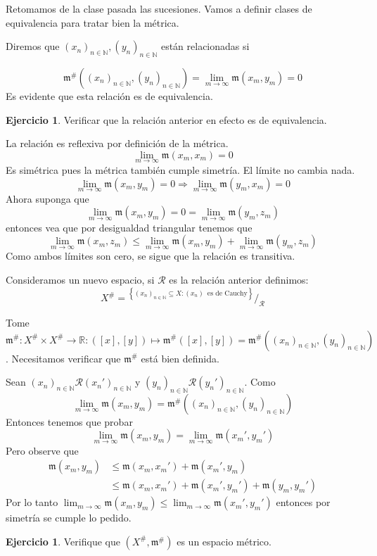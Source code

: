 \documentclass[12pt]{article}
\theoremstyle{plain}
\theoremstyle{definition}
\newtheorem{Ej}[Th]{Ejercicio}
\theoremstyle{remark}
\numberwithin{equation}{section}
\newcommand{\bN}{\mathbb{N}}        %
\newcommand{\bR}{\mathbb{R}}        %
\newcommand{\mm}{\mathfrak{m}}      %
\newcommand{\cR}{\mathcal{R}}       %
\renewcommand{\leq}{\leqslant}      %
\renewcommand{\:}{\colon}           %
\newcommand*\quot[2]{{^{\textstyle #1}\big/_{\textstyle #2}}}
\newcommand{\conj}[1]{\left\lbrace#1\right\rbrace}
\newcommand{\bonj}[1]{\left\lbrack#1\right\rbrack}
\begin{document}
\begin{multicols}{2}
Retomamos de la clase pasada las sucesiones. Vamos a definir clases de equivalencia para tratar bien la métrica. \par
Diremos que $(x_n)_{n\in\bN},(y_n)_{n\in\bN}$ están relacionadas si

$$\mm^\#((x_n)_{n\in\bN},(y_n)_{n\in\bN})=\lim_{m\to\infty}\mm(x_m,y_m)=0$$
Es evidente que esta relación es de equivalencia.
\begin{Ej}
  Verificar que la relación anterior en efecto es de equivalencia.
\end{Ej}

\begin{ptcb}

 La relación es reflexiva por definición de la métrica.
  $$\lim_{m\to\infty}\mm(x_m,x_m)=0$$
 Es simétrica pues la métrica también cumple simetría. El límite no cambia nada.
  $$\lim_{m\to\infty}\mm(x_m,y_m)=0\Rightarrow \lim_{m\to\infty}\mm(y_m,x_m)=0$$
Ahora suponga que
$$\lim_{m\to\infty}\mm(x_m,y_m)=0=\lim_{m\to\infty}\mm(y_m,z_m)$$
 entonces vea que por desigualdad triangular tenemos que
    $$\lim_{m\to\infty}\mm(x_m,z_m)\leq \lim_{m\to\infty}\mm(x_m,y_m)+\lim_{m\to\infty}\mm(y_m,z_m)$$
    Como ambos límites son cero, se sigue que la relación es transitiva.

\end{ptcb}

Consideramos un nuevo espacio, si $\cR$ es la relación anterior definimos:
$$X^\#=\quot{\conj{(x_n)_{n\in\bN}\subseteq X\colon (x_n)\,\text{ es de Cauchy}}}{\cR}$$

Tome $\mm^\#\colon X^\#\times X^\#\to\bR\colon (\bonj{x},\bonj{y})\mapsto\mm^\#(\bonj{x},\bonj{y})=\mm^\#((x_n)_{n\in\bN},(y_n)_{n\in\bN})$. Necesitamos verificar que $\mm^\#$ está bien definida.
\begin{ptcbp}
Sean $(x_n)_{n\in\bN}\cR(x_n')_{n\in\bN}$ y $(y_n)_{n\in\bN}\cR(y_n')_{n\in\bN}$. Como
$$\lim_{m\to\infty}\mm(x_m,y_m)=\mm^\#((x_n)_{n\in\bN},(y_n)_{n\in\bN})$$
Entonces tenemos que probar
$$\lim_{m\to\infty}\mm(x_m,y_m)=\lim_{m\to\infty}\mm(x_m',y_m')$$
Pero observe que
\begin{align*}
  \mm(x_m,y_m) &\leq \mm(x_m,x_m')+\mm(x_m',y_m) \\
  &\leq \mm(x_m,x_m')+\mm(x_m',y_m')+\mm(y_m,y_m')
\end{align*}
Por lo tanto $\lim_{m\to\infty}\mm(x_m,y_m)\leq \lim_{m\to\infty}\mm(x_m',y_m')$ entonces por simetría se cumple lo pedido.
\end{ptcbp}

\begin{Ej}
  Verifique que $(X^\#,\mm^\#)$ es un espacio métrico.
\end{Ej}


\end{multicols}
\end{document}
